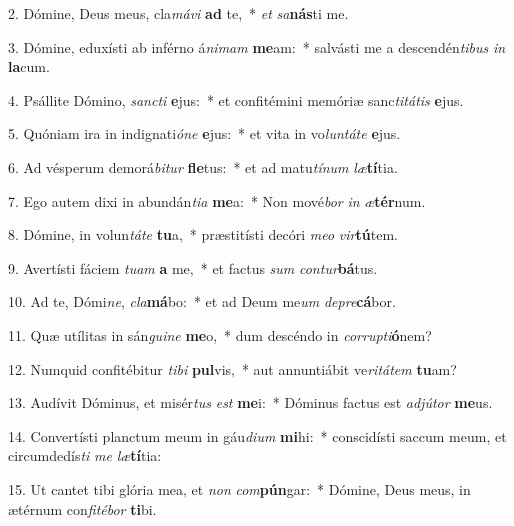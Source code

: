 2. Dómine, Deus meus, cla\textit{má}\textit{vi} \textbf{ad} te,~*  \textit{et} \textit{sa}\textbf{nás}ti me.\

3. Dómine, eduxísti ab inférno á\textit{ni}\textit{mam} \textbf{me}am:~*  salvásti me a descendén\textit{ti}\textit{bus} \textit{in} \textbf{la}cum.\

4. Psállite Dómino, \textit{sanc}\textit{ti} \textbf{e}jus:~*  et confitémini memóriæ sanc\textit{ti}\textit{tá}\textit{tis} \textbf{e}jus.\

5. Quóniam ira in indignati\textit{ó}\textit{ne} \textbf{e}jus:~*  et vita in vo\textit{lun}\textit{tá}\textit{te} \textbf{e}jus.\

6. Ad vésperum demorá\textit{bi}\textit{tur} \textbf{fle}tus:~*  et ad matu\textit{tí}\textit{num} \textit{læ}\textbf{tí}tia.\

7. Ego autem dixi in abundán\textit{ti}\textit{a} \textbf{me}a:~*  Non mové\textit{bor} \textit{in} \textit{æ}\textbf{tér}num.\

8. Dómine, in volun\textit{tá}\textit{te} \textbf{tu}a,~*  præstitísti decóri \textit{me}\textit{o} \textit{vir}\textbf{tú}tem.\

9. Avertísti fáciem \textit{tu}\textit{am} \textbf{a} me,~*  et factus \textit{sum} \textit{con}\textit{tur}\textbf{bá}tus.\

10. Ad te, Dómi\textit{ne}, \textit{cla}\textbf{má}bo:~*  et ad Deum me\textit{um} \textit{de}\textit{pre}\textbf{cá}bor.\

11. Quæ utílitas in sán\textit{gui}\textit{ne} \textbf{me}o,~*  dum descéndo in \textit{cor}\textit{rup}\textit{ti}\textbf{ó}nem?\

12. Numquid confitébitur \textit{ti}\textit{bi} \textbf{pul}vis,~*  aut annuntiábit ve\textit{ri}\textit{tá}\textit{tem} \textbf{tu}am?\

13. Audívit Dóminus, et misér\textit{tus} \textit{est} \textbf{me}i:~*  Dóminus factus est \textit{ad}\textit{jú}\textit{tor} \textbf{me}us.\

14. Convertísti planctum meum in gáu\textit{di}\textit{um} \textbf{mi}hi:~*  conscidísti saccum meum, et circumdedís\textit{ti} \textit{me} \textit{læ}\textbf{tí}tia:\

15. Ut cantet tibi glória mea, et \textit{non} \textit{com}\textbf{pún}gar:~*  Dómine, Deus meus, in ætérnum con\textit{fi}\textit{té}\textit{bor} \textbf{ti}bi.\

